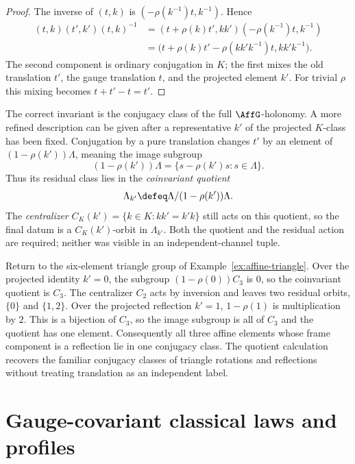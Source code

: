 \begin{proof}
The inverse of $(t,k)$ is $(-\rho(k^{-1})t,k^{-1})$.  Hence
\[
\begin{aligned}
 (t,k)(t',k')(t,k)^{-1}
 &=(t+\rho(k)t',kk')(-\rho(k^{-1})t,k^{-1})\\
 &=\bigl(t+\rho(k)t'-\rho(kk'k^{-1})t,kk'k^{-1}\bigr).
\end{aligned}
\]
The second component is ordinary conjugation in $K$; the first mixes the old
translation $t'$, the gauge translation $t$, and the projected element $k'$.
For trivial $\rho$ this mixing becomes $t+t'-t=t'$.
\end{proof}

The correct invariant is the conjugacy class of the full
$\AffG$-holonomy.  A more refined description can be given after a
representative $k'$ of the projected $K$-class has been fixed.  Conjugation by
a pure translation changes $t'$ by an element of
$(1-\rho(k'))\Lambda$, meaning the image subgroup
\[
 (1-\rho(k'))\Lambda
 =\{s-\rho(k')s:s\in\Lambda\}.
\]
Thus its residual class lies in the
\emph{coinvariant quotient}
\[
 \Lambda_{k'}\defeq
 \Lambda/(1-\rho(k'))\Lambda.
\]
The \emph{centralizer}
$C_K(k')=\{k\in K:kk'=k'k\}$ still acts on this quotient, so the final datum is
a $C_K(k')$-orbit in $\Lambda_{k'}$.  Both the quotient and the residual
action are required; neither was visible in an independent-channel tuple.

\begin{example}
Return to the six-element triangle group of
Example~\ref{ex:affine-triangle}.  Over the projected
identity $k'=0$, the subgroup
$(1-\rho(0))C_3$ is $0$, so the coinvariant quotient is $C_3$.  The centralizer
$C_2$ acts by inversion and leaves two residual orbits,
$\{0\}$ and $\{1,2\}$.  Over the projected reflection $k'=1$,
$1-\rho(1)$ is multiplication by $2$.  This is a bijection of $C_3$, so the
image subgroup is all of $C_3$ and the quotient has one element.  Consequently
all three affine elements whose frame component is a reflection lie in one
conjugacy class.  The quotient calculation recovers the familiar conjugacy
classes of triangle rotations and reflections without treating translation
as an independent label.
\end{example}

\section{Gauge-covariant classical laws and profiles}
\label{sec:complete-gauge-profile}

